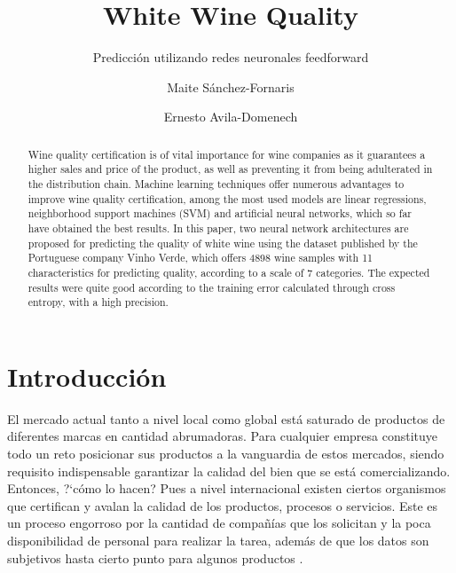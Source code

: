 \documentclass[runningheads]{llncs}
\begin{document}
%
\title{White Wine Quality}
\subtitle{Predicci{\'o}n utilizando redes neuronales feedforward}
%
%
\author{Maite S{\'a}nchez-Fornaris \and
Ernesto Avila-Domenech}
%
%
%
\maketitle              %
%
\begin{abstract}
Wine quality certification is of vital importance for wine companies as it guarantees a higher sales and price of the product, as well as preventing it from being adulterated in the distribution chain. Machine learning techniques offer numerous advantages to improve wine quality certification, among the most used models are linear regressions, neighborhood support machines (SVM) and artificial neural networks, which so far have obtained the best results. In this paper, two neural network architectures are proposed for predicting the quality of white wine using the dataset published by the Portuguese company Vinho Verde, which offers 4898 wine samples with 11 characteristics for predicting quality, according to a scale of 7 categories. The expected results were quite good according to the training error calculated through cross entropy, with a high precision.

\end{abstract}
%
%
%
\section{Introducci{\'o}n}
El mercado actual tanto a nivel local como global est{\'a} saturado de productos de diferentes marcas en cantidad abrumadoras. Para cualquier empresa constituye todo un reto posicionar sus productos a la vanguardia de estos mercados, siendo requisito indispensable garantizar la calidad del bien que se est{\'a} comercializando. Entonces, ?`c{\'o}mo lo hacen? Pues a nivel internacional existen ciertos organismos que certifican y avalan la calidad de los productos, procesos o servicios. Este es un proceso engorroso por la cantidad de compa\~{n}{\'i}as que los solicitan y la poca disponibilidad de personal para realizar la tarea, adem{\'a}s de que los datos son subjetivos hasta cierto punto para algunos productos \cite{ye2020new}.
\end{document}
